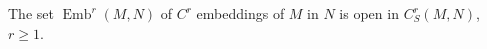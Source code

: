 The set $\operatorname{Emb}^r(M,N)$ of $C^r$ embeddings of $M$ in $N$ is open in $C^r_S(M,N)$, $r \geqslant 1$.
